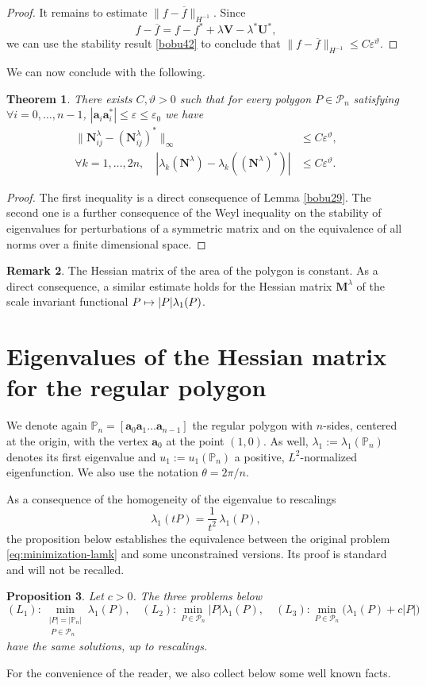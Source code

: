 \documentclass[JEP,XML,SOM,Unicode,ThmDefs,NoFloatCountersInSection,published]{cedram}
\def\mto{\mathchoice{\longmapsto}{\mapsto}{\mapsto}{\mapsto}}
\theoremstyle{plain}
\newtheorem{thm}{Theorem}[section]
\newtheorem{propo}[thm]{Proposition}
\theoremstyle{definition}
\newtheorem{rem}[thm]{Remark}
\newcommand{\bo}[1]{{\boldsymbol#1}}
\newcommand{\thetathree}{\vartheta}
\def\Pp{{\mathbb{P}_n}}
\newcommand{\vps}{\varepsilon}
\newcommand{\lb}{\lambda}
\newcommand{\ov}{\overline}
\begin{document}
\begin{proof}
It remains to estimate $ \| f -\ov f\| _{H^{-1}}$. Since
\[
f-\ov f= f-f^* + \lb \bo V-\lb^* \bo U^*,
\]
we can use the stability result \eqref{bobu42} to conclude that
$\| f -\ov f\| _{H^{-1}} \le C \vps^\thetathree$.
\end{proof}

We can now conclude with the following.
\begin{thm}\label{bobu43}
There exists $C, \thetathree >0$ such that for every polygon $P \in {\mathcal P}_n$ satisfying $\forall i=0, \dots, n-1$, $|\bo a_i\bo a_i^*| \le \vps \le \vps _0$ we have
\begin{align*}
\|\bo N^\lb _{ij} -(\bo N^\lb _{ij})^*\|_\infty &\le C \vps^\thetathree,
\\
\forall k=1, \dots, 2n, \quad |\lb_k(\bo N^\lb)- \lb_k((\bo N^{\lb})^*)|&\le C \vps^\thetathree.
\end{align*}
\end{thm}
\begin{proof}
The first inequality is a direct consequence of Lemma \ref{bobu29}. The second one is a further consequence of the Weyl inequality on the stability of eigenvalues for perturbations of a symmetric matrix and on the equivalence of all norms over a finite dimensional space.
\end{proof}

\begin{rem}
The Hessian matrix of the area of the polygon is constant. As a direct consequence, a similar estimate holds for the Hessian matrix $\bo M^\lambda$ of the scale invariant functional $P\mto |P|\lambda_1(P)$.
\end{rem}

\section{Eigenvalues of the Hessian matrix for the regular polygon}
\label{sec:eig-hessian}

We denote again $\Pp =[\bo a_0 \bo a_1 \dots\bo a_{n-1}]$ the regular polygon with $n$-sides, centered at the origin, with the vertex $\bo a_0$ at the point $(1,0)$. As well, $\lb_1:= \lb_1(\Pp)$ denotes its first eigenvalue and $u_1:=u_1(\Pp)$ a positive, $L^2$-normalized eigenfunction. We also use the notation $\theta = 2\pi/n$.

As a consequence of the homogeneity of the eigenvalue to rescalings
\[
\lambda_1(tP) = \frac{1}{t^2}\, \lambda_1(P),
\]
the proposition below establishes the equivalence between the original problem \eqref{eq:minimization-lamk} and some unconstrained versions. Its proof is standard and will not be recalled.
\begin{propo}
Let $c>0$. The three problems below
\begin{equation}\label{eq:constr}
(L_1): \min_{\substack{|P|=|\Pp|\\\ P \in \mathcal P_n}} \lambda_1(P), \quad (L_2): \min_{P \in \mathcal P_n} |P| \lambda_1(P), \quad (L_3):\min_{P\in \mathcal P_n} \big (\lambda_1(P) +c |P|\big)
\end{equation}
have the same solutions, up to rescalings.
\end{propo}
For the convenience of the reader,
we also collect below some well known facts.
\end{document}
